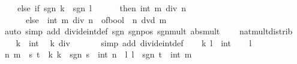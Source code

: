 \begin{isabellebody}
\ \ \ \ else\ if\ sgn\ k\ {\isacharequal}{\kern0pt}\ sgn\ l\isanewline
\ \ \ \ \ \ then\ int\ {\isacharparenleft}{\kern0pt}m\ div\ n{\isacharparenright}{\kern0pt}\isanewline
\ \ \ \ \ \ else\ {\isacharminus}{\kern0pt}\ int\ {\isacharparenleft}{\kern0pt}m\ div\ n\ {\isacharplus}{\kern0pt}\ of{\isacharunderscore}{\kern0pt}bool\ {\isacharparenleft}{\kern0pt}{\isasymnot}\ n\ dvd\ m{\isacharparenright}{\kern0pt}{\isacharparenright}{\kern0pt}{\isacharparenright}{\kern0pt}{\isachardoublequoteclose}\isanewline
%
\isadelimproof
\ \ %
\endisadelimproof
%
\isatagproof
{}\isamarkupfalse%
\ {\isacharparenleft}{\kern0pt}auto\ simp\ add{\isacharcolon}{\kern0pt}\ divide{\isacharunderscore}{\kern0pt}int{\isacharunderscore}{\kern0pt}def\ sgn{\isacharunderscore}{\kern0pt}{}{\isacharunderscore}{\kern0pt}{}\ sgn{\isacharunderscore}{\kern0pt}{}{\isacharunderscore}{\kern0pt}pos\ sgn{\isacharunderscore}{\kern0pt}mult\ abs{\isacharunderscore}{\kern0pt}mult\isanewline
\ \ \ \ nat{\isacharunderscore}{\kern0pt}mult{\isacharunderscore}{\kern0pt}distrib{\isacharparenright}{\kern0pt}%
\endisatagproof
{\isafoldproof}%
%
\isadelimproof
\isanewline
%
\endisadelimproof
\isanewline
{}\isamarkupfalse%
%
\isadelimproof
\ %
\endisadelimproof
%
\isatagproof
{}\isamarkupfalse%
\isanewline
\ \ \isamarkupfalse%
\ k\ {\isacharcolon}{\kern0pt}{\isacharcolon}{\kern0pt}\ int\ \isamarkupfalse%
\ {\isachardoublequoteopen}k\ div\ {}\ {\isacharequal}{\kern0pt}\ {}{\isachardoublequoteclose}\isanewline
\ \ \isamarkupfalse%
\ {\isacharparenleft}{\kern0pt}simp\ add{\isacharcolon}{\kern0pt}\ divide{\isacharunderscore}{\kern0pt}int{\isacharunderscore}{\kern0pt}def{\isacharparenright}{\kern0pt}\isanewline
{}\isamarkupfalse%
\isanewline
\ \ \isamarkupfalse%
\ k\ l\ {\isacharcolon}{\kern0pt}{\isacharcolon}{\kern0pt}\ int\isanewline
\ \ \isamarkupfalse%
\ {\isachardoublequoteopen}l\ {\isasymnoteq}\ {}{\isachardoublequoteclose}\isanewline
\ \ \isamarkupfalse%
\ n\ m\ \ s\ t\ \ k{\isacharcolon}{\kern0pt}\ {\isachardoublequoteopen}k\ {\isacharequal}{\kern0pt}\ sgn\ s\ {\isacharasterisk}{\kern0pt}\ int\ n{\isachardoublequoteclose}\ \ l{\isacharcolon}{\kern0pt}\ {\isachardoublequoteopen}l\ {\isacharequal}{\kern0pt}\ sgn\ t\ {\isacharasterisk}{\kern0pt}\ int\ m{\isachardoublequoteclose}\ \isanewline
\ \ \ \ \isamarkupfalse%

\end{isabellebody}
